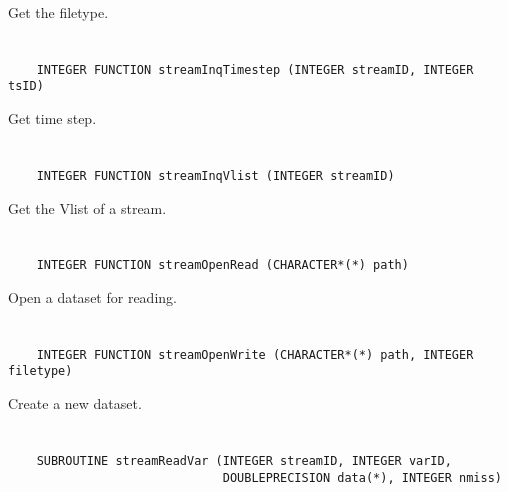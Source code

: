 Get the filetype.


\section*{\tt {}}

\begin{verbatim}
    INTEGER FUNCTION streamInqTimestep (INTEGER streamID, INTEGER tsID)
\end{verbatim}

Get time step.


\section*{\tt {}}

\begin{verbatim}
    INTEGER FUNCTION streamInqVlist (INTEGER streamID)
\end{verbatim}

Get the Vlist of a stream.


\section*{\tt {}}

\begin{verbatim}
    INTEGER FUNCTION streamOpenRead (CHARACTER*(*) path)
\end{verbatim}

Open a dataset for reading.


\section*{\tt {}}

\begin{verbatim}
    INTEGER FUNCTION streamOpenWrite (CHARACTER*(*) path, INTEGER filetype)
\end{verbatim}

Create a new dataset.


\section*{\tt {}}

\begin{verbatim}
    SUBROUTINE streamReadVar (INTEGER streamID, INTEGER varID,
                              DOUBLEPRECISION data(*), INTEGER nmiss)
\end{verbatim}

